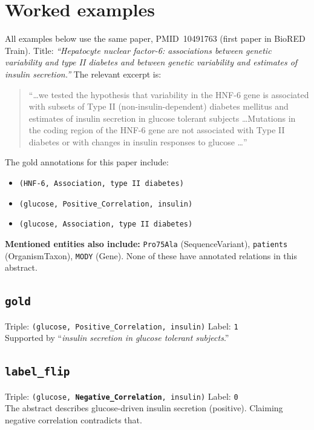 \documentclass[11pt,a4paper]{article}
\newcommand{\code}[1]{\texttt{#1}}
\begin{document}
\section*{Worked examples}

All examples below use the same paper, PMID~10491763 (first paper in BioRED Train). Title: \emph{``Hepatocyte nuclear factor-6: associations between genetic variability and type II diabetes and between genetic variability and estimates of insulin secretion.''} The relevant excerpt is:

\begin{quote}
\small
``\dots we tested the hypothesis that variability in the HNF-6 gene is associated with subsets of Type II (non-insulin-dependent) diabetes mellitus and estimates of insulin secretion in glucose tolerant subjects \dots Mutations in the coding region of the HNF-6 gene are not associated with Type II diabetes or with changes in insulin responses to glucose \dots''
\end{quote}

\noindent
The gold annotations for this paper include:
\begin{itemize}
\item \code{(HNF-6, Association, type II diabetes)}
\item \code{(glucose, Positive\_Correlation, insulin)}
\item \code{(glucose, Association, type II diabetes)}
\end{itemize}

\noindent
\textbf{Mentioned entities also include:} \code{Pro75Ala} (SequenceVariant), \code{patients} (OrganismTaxon), \code{MODY} (Gene). None of these have annotated relations in this abstract.

\subsection*{\code{gold}}
Triple: \code{(glucose, Positive\_Correlation, insulin)} \hfill Label: \code{1}\\
Supported by ``\emph{insulin secretion in glucose tolerant subjects}.''

\subsection*{\code{label\_flip}}
Triple: \code{(glucose, \textbf{Negative\_Correlation}, insulin)} \hfill Label: \code{0}\\
The abstract describes glucose-driven insulin secretion (positive). Claiming negative correlation contradicts that.
\end{document}
